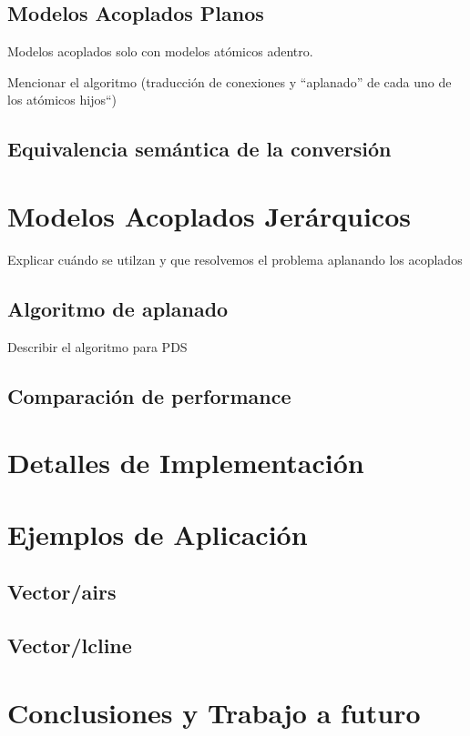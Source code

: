 \documentclass[a4paper,	11pt]{article}
\begin{document}
\subsection{Modelos Acoplados Planos}
Modelos acoplados solo con modelos atómicos adentro.

Mencionar el algoritmo (traducción de conexiones y ``aplanado'' de cada uno de los atómicos hijos``)	

\subsection{Equivalencia semántica de la conversión}

\section{Modelos Acoplados Jerárquicos}
Explicar cuándo se utilzan y que resolvemos el problema aplanando los acoplados

\subsection{Algoritmo de aplanado}
Describir el algoritmo para PDS

\subsection{Comparación de performance}

\section{Detalles de Implementación}

\section{Ejemplos de Aplicación}
\subsection{Vector/airs}
\subsection{Vector/lcline}

\section{Conclusiones y Trabajo a futuro}
\end{document}

